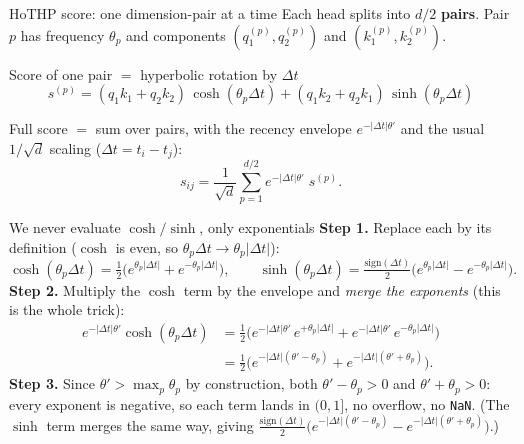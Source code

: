 \documentclass[aspectratio=169]{beamer}
\begin{document}
\begin{frame}{HoTHP score: one dimension-pair at a time}
  Each head splits into $d/2$ \textbf{pairs}. Pair $p$ has frequency $\theta_p$
  and components $(q_1^{(p)}, q_2^{(p)})$ and $(k_1^{(p)}, k_2^{(p)})$.
  \vspace{0.3em}
  \begin{block}{Score of one pair $=$ hyperbolic rotation by $\Delta t$}
    \[
      s^{(p)} = (q_1 k_1 + q_2 k_2)\,\cosh(\theta_p \Delta t)
              + (q_1 k_2 + q_2 k_1)\,\sinh(\theta_p \Delta t)
    \]
  \end{block}
  Full score $=$ sum over pairs, with the recency envelope $e^{-|\Delta t|\theta'}$
  and the usual $1/\sqrt{d}$ scaling ($\Delta t = t_i - t_j$):
  \[
    s_{ij} = \frac{1}{\sqrt{d}} \sum_{p=1}^{d/2}
      e^{-|\Delta t|\theta'}\; s^{(p)} .
  \]

\end{frame}

\begin{frame}{We never evaluate $\cosh/\sinh$, only exponentials}
  \textbf{Step 1.} Replace each by its definition ($\cosh$ is even, so
  $\theta_p\Delta t \to \theta_p|\Delta t|$):
  \[
    \cosh(\theta_p \Delta t) = \tfrac{1}{2}\big(e^{\theta_p|\Delta t|} + e^{-\theta_p|\Delta t|}\big),
    \qquad
    \sinh(\theta_p \Delta t) = \tfrac{\mathrm{sign}(\Delta t)}{2}\big(e^{\theta_p|\Delta t|} - e^{-\theta_p|\Delta t|}\big).
  \]
  \textbf{Step 2.} Multiply the $\cosh$ term by the envelope and \emph{merge the
  exponents} (this is the whole trick):
  \begin{align*}
    e^{-|\Delta t|\theta'}\cosh(\theta_p \Delta t)
      &= \tfrac{1}{2}\Big(
          e^{-|\Delta t|\theta'}\, e^{+\theta_p|\Delta t|}
        + e^{-|\Delta t|\theta'}\, e^{-\theta_p|\Delta t|}\Big) \\[0.3em]
      &= \tfrac{1}{2}\Big(
          e^{-|\Delta t|(\theta' - \theta_p)}
        + e^{-|\Delta t|(\theta' + \theta_p)}\Big).
  \end{align*}
  \textbf{Step 3.} Since $\theta' > \max_p \theta_p$ by construction, both
  $\theta'-\theta_p>0$ and $\theta'+\theta_p>0$: \alert{every exponent is
  negative}, so each term lands in $(0,1]$, no overflow, no \texttt{NaN}.
  \vspace{0.2em}
  {\small (The $\sinh$ term merges the same way, giving
  $\tfrac{\mathrm{sign}(\Delta t)}{2}\big(e^{-|\Delta t|(\theta'-\theta_p)} - e^{-|\Delta t|(\theta'+\theta_p)}\big)$.)}
\end{frame}
\end{document}
